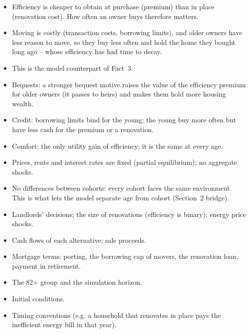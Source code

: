 \begin{itemize}
  \item Efficiency is cheaper to obtain at purchase (premium) than in place
    (renovation cost). How often an owner buys therefore matters.
  \item Moving is costly (transaction costs, borrowing limits), and older
    owners have less reason to move, so they buy less often and hold the
    home they bought long ago -- whose efficiency has had time to decay.
  \item This is the model counterpart of Fact~3.
\end{itemize}

\begin{itemize}
  \item Bequests: a stronger bequest motive raises the value of the
    efficiency premium for older owners (it passes to heirs) and makes
    them hold more housing wealth.
  \item Credit: borrowing limits bind for the young; the young buy more
    often but have less cash for the premium or a renovation.
  \item Comfort: the only utility gain of efficiency; it is the same at
    every age.
\end{itemize}

\begin{itemize}
  \item Prices, rents and interest rates are fixed (partial equilibrium);
    no aggregate shocks.
  \item No differences between cohorts: every cohort faces the same
    environment. This is what lets the model separate age from cohort
    (Section~2 bridge).
  \item Landlords' decisions; the size of renovations (efficiency is
    binary); energy price shocks.
\end{itemize}

\begin{itemize}
  \item Cash flows of each alternative; sale proceeds.
  \item Mortgage terms: porting, the borrowing cap of movers, the
    renovation loan, payment in retirement.
  \item The 82+ group and the simulation horizon.
  \item Initial conditions.
  \item Timing conventions (e.g. a household that renovates in place pays
    the inefficient energy bill in that year).
\end{itemize}
